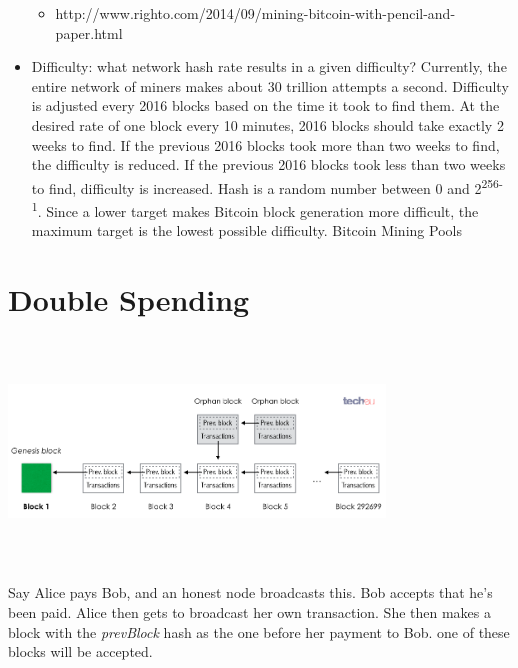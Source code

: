 \documentclass{article}
\begin{document}
\begin{itemize}
\begin{itemize}
      \item http://www.righto.com/2014/09/mining-bitcoin-with-pencil-and-paper.html
    \end{itemize}
  \item Difficulty: what network hash rate results in a given difficulty?
    \subitem Currently, the entire network of miners makes about 30 trillion attempts a second.
    \subitem Difficulty is adjusted every 2016 blocks based on the time it took to find them.
    \subitem At the desired rate of one block every 10 minutes, 2016 blocks should take  exactly 2 weeks
    to find.
    \subitem If the previous 2016 blocks took more than two weeks to find, the difficulty is reduced. 
    \subitem If the previous 2016 blocks took less than two weeks to find, difficulty is increased.
    \subitem Hash is a random number between 0 and 2\textsuperscript{256-1}.
    \subitem Since a lower target makes Bitcoin block generation more difficult, the maximum target is the lowest possible difficulty.
    \subitem Bitcoin Mining Pools
\end{itemize}
\section*{Double Spending}
\begin{center}
  \includegraphics[width=10cm, height=6cm]{orphan.png}
\end{center}
Say Alice pays Bob, and an honest node broadcasts this. Bob accepts that he's been paid. Alice then
gets to broadcast her own transaction. She then makes a block with the \emph{prevBlock} hash as the one before her payment to Bob.
one of these blocks will be accepted. 
\end{document}
